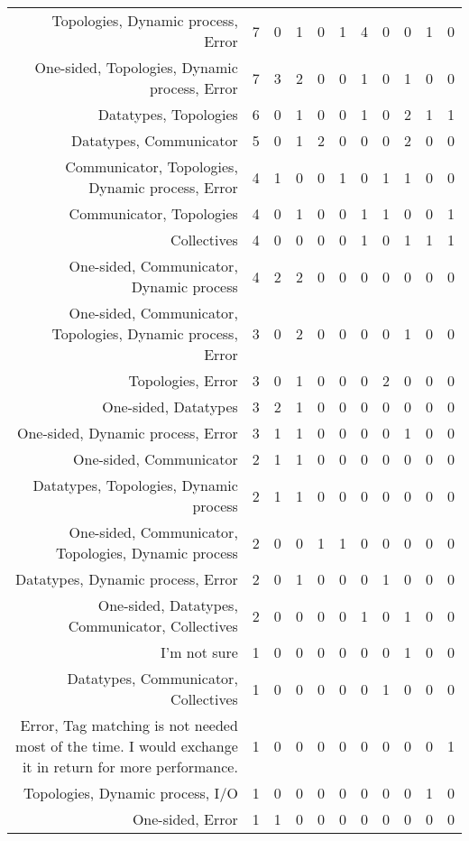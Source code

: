 {\begin{landscape}
\begin{longtable}[htb]{r|c|c|c|c|c|c|c|c|c|c}
{Topologies, Dynamic process, Error} & 7 & 0 & 1 & 0 & 1 & 4 & 0 & 0 & 1 & 0 \\%
{One-sided, Topologies, Dynamic process, Error} & 7 & 3 & 2 & 0 & 0 & 1 & 0 & 1 & 0 & 0 \\%
{Datatypes, Topologies} & 6 & 0 & 1 & 0 & 0 & 1 & 0 & 2 & 1 & 1 \\%
{Datatypes, Communicator} & 5 & 0 & 1 & 2 & 0 & 0 & 0 & 2 & 0 & 0 \\%
{Communicator, Topologies, Dynamic process, Error} & 4 & 1 & 0 & 0 & 1 & 0 & 1 & 1 & 0 & 0 \\%
{Communicator, Topologies} & 4 & 0 & 1 & 0 & 0 & 1 & 1 & 0 & 0 & 1 \\%
{Collectives} & 4 & 0 & 0 & 0 & 0 & 1 & 0 & 1 & 1 & 1 \\%
{One-sided, Communicator, Dynamic process} & 4 & 2 & 2 & 0 & 0 & 0 & 0 & 0 & 0 & 0 \\%
{One-sided, Communicator, Topologies, Dynamic process, Error} & 3 & 0 & 2 & 0 & 0 & 0 & 0 & 1 & 0 & 0 \\%
{Topologies, Error} & 3 & 0 & 1 & 0 & 0 & 0 & 2 & 0 & 0 & 0 \\%
{One-sided, Datatypes} & 3 & 2 & 1 & 0 & 0 & 0 & 0 & 0 & 0 & 0 \\%
{One-sided, Dynamic process, Error} & 3 & 1 & 1 & 0 & 0 & 0 & 0 & 1 & 0 & 0 \\%
{One-sided, Communicator} & 2 & 1 & 1 & 0 & 0 & 0 & 0 & 0 & 0 & 0 \\%
{Datatypes, Topologies, Dynamic process} & 2 & 1 & 1 & 0 & 0 & 0 & 0 & 0 & 0 & 0 \\%
{One-sided, Communicator, Topologies, Dynamic process} & 2 & 0 & 0 & 1 & 1 & 0 & 0 & 0 & 0 & 0 \\%
{Datatypes, Dynamic process, Error} & 2 & 0 & 1 & 0 & 0 & 0 & 1 & 0 & 0 & 0 \\%
{One-sided, Datatypes, Communicator, Collectives} & 2 & 0 & 0 & 0 & 0 & 1 & 0 & 1 & 0 & 0 \\%
{I'm not sure} & 1 & 0 & 0 & 0 & 0 & 0 & 0 & 1 & 0 & 0 \\%
{Datatypes, Communicator, Collectives} & 1 & 0 & 0 & 0 & 0 & 0 & 1 & 0 & 0 & 0 \\%
{Error, Tag matching is not needed most of the time. I would exchange it in return for more performance.} & 1 & 0 & 0 & 0 & 0 & 0 & 0 & 0 & 0 & 1 \\%
{Topologies, Dynamic process, I/O} & 1 & 0 & 0 & 0 & 0 & 0 & 0 & 0 & 1 & 0 \\%
{One-sided, Error} & 1 & 1 & 0 & 0 & 0 & 0 & 0 & 0 & 0 & 0 \\%

\end{longtable}
\end{landscape}}
